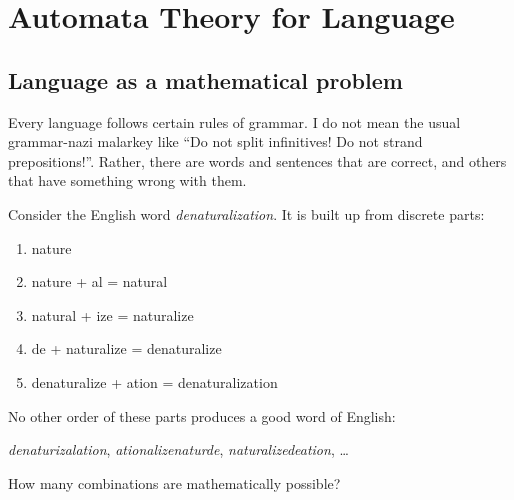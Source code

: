 \chapter*{\texorpdfstring{\color{brown!95}Automata Theory for Language}{Automata Theory for Language}}
\label{cha:fsa}


\section{Language as a mathematical problem}

Every language follows certain rules of grammar.
I do not mean the usual grammar-nazi malarkey like ``Do not split infinitives! Do not strand prepositions!''.
Rather, there are words and sentences that are correct, and others that have something wrong with them.

\begin{examplebox}
    Consider the English word \emph{denaturalization}.
    It is built up from discrete parts:
    \begin{enumerate}
        \item nature
        \item nature + al = natural
        \item natural + ize = naturalize
        \item de + naturalize = denaturalize
        \item denaturalize + ation = denaturalization
    \end{enumerate}
    No other order of these parts produces a good word of English:
    
    \smallskip
    \noindent
    \emph{denaturizalation}, \emph{ationalizenaturde}, \emph{naturalizedeation}, \ldots
\end{examplebox}
%
\begin{homework}
    How many combinations are mathematically possible?
\end{homework}

